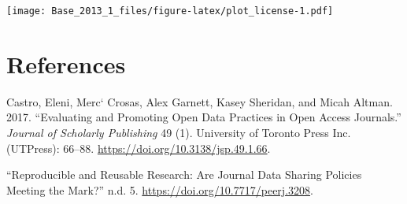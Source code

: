 \documentclass[]{article}
\begin{document}
\texttt{[image: Base\_2013\_1\_files/figure-latex/plot\_license-1.pdf]}

\hypertarget{references}{%
\section*{References}\label{references}}

\hypertarget{refs}{}
\leavevmode\hypertarget{ref-Castro_2017}{}%
Castro, Eleni, Merc\e` Crosas, Alex Garnett, Kasey Sheridan, and Micah
Altman. 2017. ``Evaluating and Promoting Open Data Practices in Open
Access Journals.'' \emph{Journal of Scholarly Publishing} 49 (1).
University of Toronto Press Inc. (UTPress): 66--88.
\url{https://doi.org/10.3138/jsp.49.1.66}.

\leavevmode\hypertarget{ref-Vasilevsky_2017}{}%
``Reproducible and Reusable Research: Are Journal Data Sharing Policies
Meeting the Mark?'' n.d. 5. \url{https://doi.org/10.7717/peerj.3208}.
\end{document}
